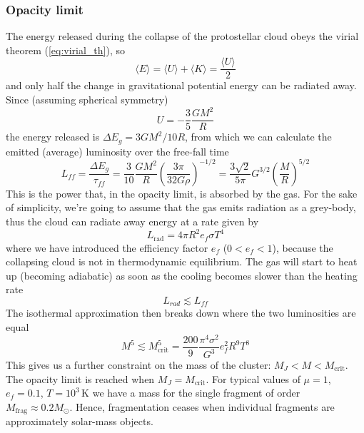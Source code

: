 \subsubsection*{Opacity limit}
The energy released during the collapse of the protostellar cloud obeys the virial theorem (\ref{eq:virial_th}), so 
\begin{equation*}
    \langle E \rangle = \langle U \rangle + \langle K \rangle = \frac{\langle U \rangle}{2}
\end{equation*}
and only half the change in gravitational potential energy can be radiated away. Since (assuming spherical symmetry)
\begin{equation*}
    U = -\frac{3}{5}\frac{GM^{2}}{R}
\end{equation*}
the energy released is $\Delta E_{g}=3GM^{2}/10R$, from which we can calculate the emitted (average) luminosity over the free-fall time 
\begin{equation}
    L_{ff} = \frac{\Delta E_{g}}{\tau_{ff}} = \frac{3}{10}\frac{GM^{2}}{R}\left(\frac{3\pi}{32G\rho}\right)^{-1/2} = \frac{3\sqrt{2}}{5\pi}G^{3/2}\left(\frac{M}{R}\right)^{5/2}
    \label{eq_luminosity_opacitylimit}
\end{equation}
This is the power that, in the opacity limit, is absorbed by the gas. For the sake of simplicity, we're going to assume that the gas emits radiation as a grey-body, thus the cloud can radiate away energy at a rate given by 
\begin{equation*}
    L_{\text{rad}} = 4\pi R^{2}e_{f}\sigma T^{4}
\end{equation*}
where we have introduced the eﬃciency factor $e_{f}$ ($0 < e_{f} < 1$), because the collapsing cloud is not in thermodynamic equilibrium. The gas will start to
heat up (becoming adiabatic) as soon as the cooling becomes slower than the heating rate
\begin{equation*}
    L_{rad} \lesssim L_{ff}
\end{equation*}
The isothermal approximation then breaks down where the two luminosities are equal 
\begin{equation}
    M^{5}\lesssim M^{5}_{\text{crit}} = \frac{200}{9}\frac{\pi^{4}\sigma^{2}}{G^{3}}e_{f}^{2}R^{9}T^{8}
    \label{eq:isothermal_breakdown}
\end{equation}
This gives us a further constraint on the mass of the cluster: $M_{J}<M<M_{\text{crit}}$. The opacity limit is reached when $M_{J} = M_{\text{crit}}$. For typical values of $\mu = 1$, $e_{f} = 0.1$, $T = 10^{3}\,\text{K}$ we have a mass for the single fragment of order $M_{\text{frag}} \approx 0.2M_{\odot}$. Hence, fragmentation ceases when individual fragments are approximately solar-mass objects.

